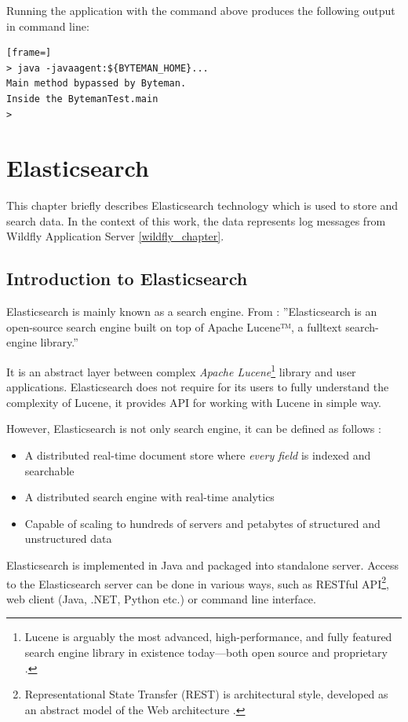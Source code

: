 \documentclass[12pt,oneside]{fithesis2}
\begin{document}
Running the application with the command above produces the following output in command line:
\begin{lstlisting}[frame=]
> java -javaagent:${BYTEMAN_HOME}...
Main method bypassed by Byteman.
Inside the BytemanTest.main
>
\end{lstlisting}

\chapter{Elasticsearch}
\label{elasticsearch_chap}
This chapter briefly describes Elasticsearch technology which is used to store and search data. In the context of this work, the data represents log messages from Wildfly Application Server \ref{wildfly_chapter}.

\section{Introduction to Elasticsearch}
Elasticsearch is mainly known as a search engine. From \cite{elasticsearch_defnitive_guide}: ''Elasticsearch is an open-source search engine built on top of Apache Lucene™, a fulltext search-engine library.''

It is an abstract layer between complex \textit{Apache Lucene}\footnote{Lucene is arguably the most advanced, high-performance, and fully featured search engine library in existence today—both open source and proprietary \cite{elasticsearch_defnitive_guide}.} library and user applications. Elasticsearch does not require for its users to fully understand the complexity of Lucene, it provides API for working with Lucene in simple way.

However, Elasticsearch is not only search engine, it can be defined as follows \cite{elasticsearch_defnitive_guide}:

\begin{itemize}
	\item A distributed real-time document store where \textit{every field} is indexed and searchable
	\item A distributed search engine with real-time analytics
	\item Capable of scaling to hundreds of servers and petabytes of structured and unstructured data
\end{itemize}

Elasticsearch is implemented in Java and packaged into standalone server. Access to the Elasticsearch server can be done in various ways, such as RESTful API\footnote{Representational State Transfer (REST) is architectural style, developed as an abstract model of the Web architecture \cite{rest}.}, web client (Java, .NET, Python etc.) or command line interface.
\end{document}
